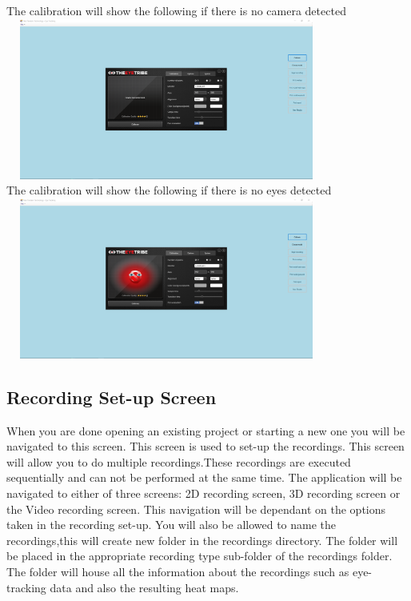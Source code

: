 The calibration will show the following if there is no camera detected\\


\includegraphics[width=400px,height=200px]{./Images/NoCameraCalibration.PNG}\\

The calibration will show the following if there is no eyes detected\\


\includegraphics[width=400px,height=200px]{./Images/NoEyeCalibration.PNG}\\




\subsection{Recording Set-up Screen}
When you are done opening an existing project or starting a new one you will be navigated to this screen. This screen is used to set-up the recordings. This screen will allow you to do multiple recordings.These recordings are executed sequentially and can not be performed at the same time.
The application will be navigated to either of three screens: 2D recording screen, 3D recording screen or the Video recording screen. This navigation will be dependant on the options taken in the recording set-up.
You will also be allowed to name the recordings,this will create new folder in the recordings directory. The folder will be placed in the appropriate recording type sub-folder of the recordings folder. The folder will house all the information about the recordings such as eye-tracking data and also the resulting heat maps.

